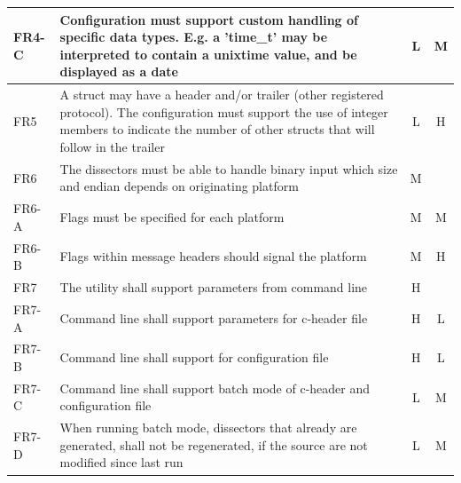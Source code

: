 \begin{table}[ht]
{\begin{tabularx}{1.2\textwidth}{l X c c}
	FR4-C & Configuration must support custom handling of specific data types. E.g. a 'time\_t' may be interpreted to contain a unixtime value, and be displayed as a date & L & M \\
	\midrule
	FR5 & A struct may have a header and/or trailer (other registered protocol). The configuration must support the use of integer members to indicate the number of other structs that will follow in the trailer & L & H \\
	\midrule
	FR6 & The dissectors must be able to handle binary input which size and endian depends on originating platform & M & \\
	FR6-A & Flags must be specified for each platform & M & M \\
	FR6-B & Flags within message headers should signal the platform & M & H \\
	\midrule
	FR7 & The utility shall support parameters from command line & H & \\
	FR7-A & Command line shall support parameters for c-header file & H & L \\
	FR7-B & Command line shall support for configuration file & H & L \\
	FR7-C & Command line shall support batch mode of c-header and configuration file & L & M \\
	FR7-D & When running batch mode, dissectors that already are generated, shall not be regenerated, if the source are not modified since last run & L & M \\
	\bottomrule
\end{tabularx}}
\end{table}

